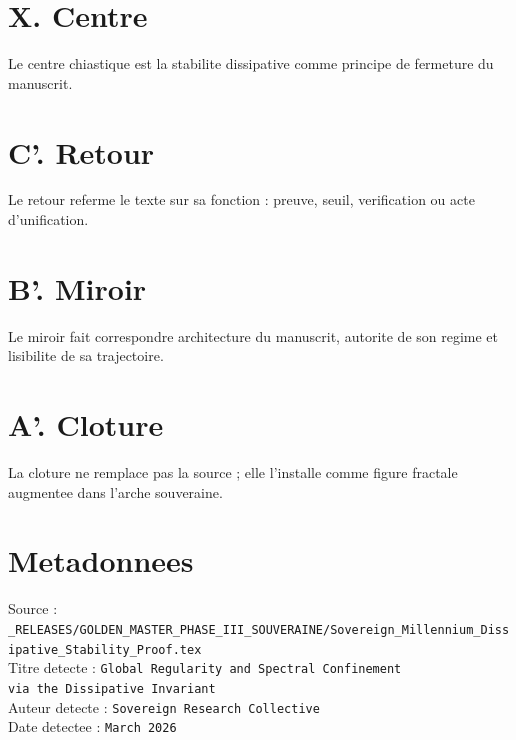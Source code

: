 \documentclass[11pt,a4paper]{article}
\begin{document}
\section*{X. Centre}
Le centre chiastique est la stabilite dissipative comme principe de fermeture du manuscrit.

\section*{C'. Retour}
Le retour referme le texte sur sa fonction : preuve, seuil, verification ou acte d'unification.

\section*{B'. Miroir}
Le miroir fait correspondre architecture du manuscrit, autorite de son regime et lisibilite de sa trajectoire.

\section*{A'. Cloture}
La cloture ne remplace pas la source ; elle l'installe comme figure fractale augmentee dans l'arche souveraine.

\section*{Metadonnees}
Source : \texttt{_RELEASES/GOLDEN_MASTER_PHASE_III_SOUVERAINE/Sovereign_Millennium_Dissipative_Stability_Proof.tex}\\
Titre detecte : \texttt{Global Regularity and Spectral Confinement\\ via the Dissipative Invariant}\\
Auteur detecte : \texttt{Sovereign Research Collective}\\
Date detectee : \texttt{March 2026}
\end{document}
